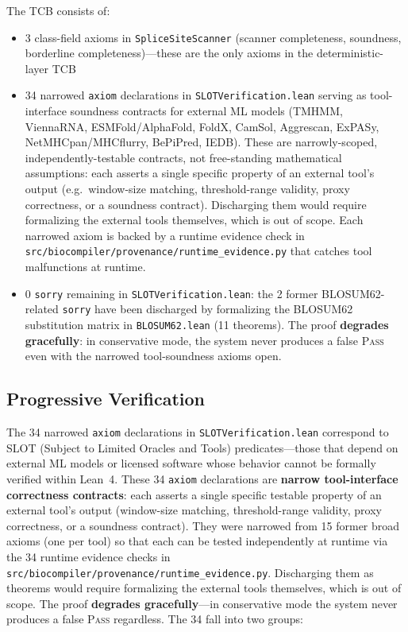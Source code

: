 \documentclass[11pt,a4paper]{article}
\theoremstyle{definition}
\newcommand{\PASS}{\textsc{Pass}}
\begin{document}
The TCB consists of:
\begin{itemize}[leftmargin=*,itemsep=1pt]
\item 3 class-field axioms in \texttt{SpliceSiteScanner} (scanner completeness, soundness, borderline completeness)---these are the only axioms in the deterministic-layer TCB
\item 34 narrowed \texttt{axiom} declarations in \texttt{SLOTVerification.lean} serving as tool-interface soundness contracts for external ML models (TMHMM, ViennaRNA, ESMFold/AlphaFold, FoldX, CamSol, Aggrescan, ExPASy, NetMHCpan/MHCflurry, BePiPred, IEDB). These are narrowly-scoped, independently-testable contracts, not free-standing mathematical assumptions: each asserts a single specific property of an external tool's output (e.g.\ window-size matching, threshold-range validity, proxy correctness, or a soundness contract). Discharging them would require formalizing the external tools themselves, which is out of scope. Each narrowed axiom is backed by a runtime evidence check in \texttt{src/biocompiler/provenance/runtime\_evidence.py} that catches tool malfunctions at runtime.
\item 0 \texttt{sorry} remaining in \texttt{SLOTVerification.lean}: the 2 former BLOSUM62-related \texttt{sorry} have been discharged by formalizing the BLOSUM62 substitution matrix in \texttt{BLOSUM62.lean} (11 theorems). The proof \textbf{degrades gracefully}: in conservative mode, the system never produces a false \PASS{} even with the narrowed tool-soundness axioms open.
\end{itemize}

\subsection{Progressive Verification}

The 34 narrowed \texttt{axiom} declarations in \texttt{SLOTVerification.lean} correspond to SLOT (Subject to Limited Oracles and Tools) predicates---those that depend on external ML models or licensed software whose behavior cannot be formally verified within Lean~4. These 34 \texttt{axiom} declarations are \textbf{narrow tool-interface correctness contracts}: each asserts a single specific testable property of an external tool's output (window-size matching, threshold-range validity, proxy correctness, or a soundness contract). They were narrowed from 15 former broad axioms (one per tool) so that each can be tested independently at runtime via the 34 runtime evidence checks in \texttt{src/biocompiler/provenance/runtime\_evidence.py}. Discharging them as theorems would require formalizing the external tools themselves, which is out of scope. The proof \textbf{degrades gracefully}---in conservative mode the system never produces a false \PASS{} regardless. The 34 fall into two groups:
\end{document}
